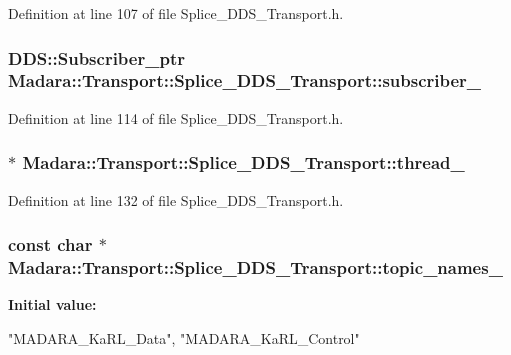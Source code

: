 Definition at line 107 of file Splice\_\-DDS\_\-Transport.h.

\hypertarget{classMadara_1_1Transport_1_1Splice__DDS__Transport_a242a524e861f25b099e02dc946aa8d77}{
\subsubsection[{subscriber\_\-}]{\setlength{\rightskip}{0pt plus 5cm}DDS::Subscriber\_\-ptr {\bf Madara::Transport::Splice\_\-DDS\_\-Transport::subscriber\_\-}}}
\label{d0/d91/classMadara_1_1Transport_1_1Splice__DDS__Transport_a242a524e861f25b099e02dc946aa8d77}


Definition at line 114 of file Splice\_\-DDS\_\-Transport.h.

\hypertarget{classMadara_1_1Transport_1_1Splice__DDS__Transport_a2559bf40f8ffe11ccffa1bc3bc58a849}{
\subsubsection[{thread\_\-}]{$\ast$ {\bf Madara::Transport::Splice\_\-DDS\_\-Transport::thread\_\-}}}
\label{d0/d91/classMadara_1_1Transport_1_1Splice__DDS__Transport_a2559bf40f8ffe11ccffa1bc3bc58a849}


Definition at line 132 of file Splice\_\-DDS\_\-Transport.h.

\hypertarget{classMadara_1_1Transport_1_1Splice__DDS__Transport_a1080968848e7917824f947a49f5d7d7e}{
\subsubsection[{topic\_\-names\_\-}]{\setlength{\rightskip}{0pt plus 5cm}const char $\ast$ {\bf Madara::Transport::Splice\_\-DDS\_\-Transport::topic\_\-names\_\-}}}
\label{d0/d91/classMadara_1_1Transport_1_1Splice__DDS__Transport_a1080968848e7917824f947a49f5d7d7e}
{\bfseries Initial value:}
\begin{DoxyCode}
 {
  "MADARA_KaRL_Data",
  "MADARA_KaRL_Control"
}
\end{DoxyCode}


